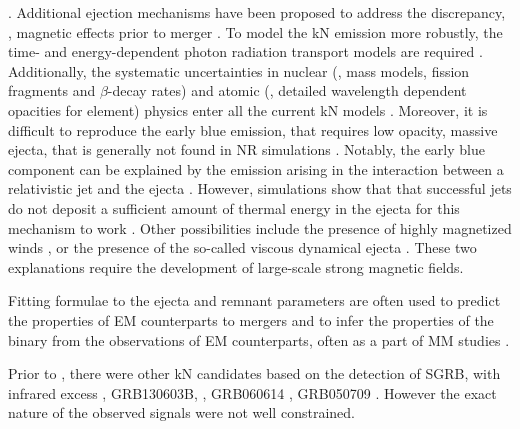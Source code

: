 \citep{Sekiguchi:2016bjd,Siegel:2019mlp,Perego:2017wtu,Kawaguchi:2018ptg}.
%
Additional ejection mechanisms have been proposed to address the discrepancy, \eg, 
magnetic effects prior to merger \citep{Metzger:2018qfl,Fernandez:2018kax,Radice:2018ghv}. 
%
To model the \ac{kN} emission more robustly, the time- and energy-dependent 
photon radiation transport models are required 
\citep{Kasen:2017sxr,Tanaka:2017qxj,Miller:2019dpt,Bulla:2019muo}.
Additionally, the systematic uncertainties in
nuclear (\eg, mass models, fission fragments and $\beta$-decay
rates) and atomic (\eg, detailed wavelength dependent opacities for
\rproc{} element) physics enter all the current \ac{kN} models 
\citep{Eichler:2014kma,Rosswog:2016dhy,Gaigalas:2019ptx}.
%
Moreover, it is difficult to reproduce the early blue emission, that requires 
low opacity, massive ejecta, that is generally not found in \ac{NR} 
simulations \citep{Fahlman:2018llv}. 
Notably, the early blue component can be explained by the emission arising 
in the interaction between a relativistic jet and the ejecta
\citep{Lazzati:2016yxl,Bromberg:2017crh,Piro:2017ayh}.
However, simulations show that that successful jets do not deposit a sufficient amount of thermal energy in the ejecta for this mechanism to work \citep{Duffell:2018iig}. 
Other possibilities include the presence of highly magnetized winds \citep{Metzger:2018uni,Fernandez:2018kax},
or the presence of the so-called viscous dynamical ejecta \citep{Radice:2018ghv}.
These two explanations require the development of large-scale strong magnetic fields.

Fitting formulae to the ejecta and remnant parameters are often used to predict the 
properties of \ac{EM} counterparts to mergers and to infer the properties of the 
binary from the observations of \ac{EM} counterparts, often as a part of \ac{MM} studies 
\citep{Dietrich:2020efo,Breschi:2021tbm,Nicholl:2021rcr,Dietrich:2020efo}.

Prior to \AT{}, there were other \ac{kN} candidates based on the 
detection of \ac{SGRB}, with infrared excess \eg, 
GRB130603B, \citep{Berger:2013wna,Tanvir:2013pia}, 
GRB060614 \citep{Jin:2015txa,Yang:2015pha}, 
GRB050709 \citep{Jin:2016pnm}.
However the exact nature of the observed signals were not well constrained. 


